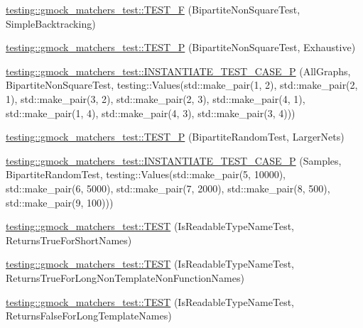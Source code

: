 \begin{DoxyCompactItemize}
\item 
\hyperlink{namespacetesting_1_1gmock__matchers__test_a7d2395b1cb6a90bdc8d46ae06f99f6c7}{testing\+::gmock\+\_\+matchers\+\_\+test\+::\+T\+E\+S\+T\+\_\+F} (Bipartite\+Non\+Square\+Test, Simple\+Backtracking)
\item 
\hyperlink{namespacetesting_1_1gmock__matchers__test_a3ac913ed55a7ac2636ae7bfce04296e9}{testing\+::gmock\+\_\+matchers\+\_\+test\+::\+T\+E\+S\+T\+\_\+P} (Bipartite\+Non\+Square\+Test, Exhaustive)
\item 
\hyperlink{namespacetesting_1_1gmock__matchers__test_a64ef722e930c3088ddea704ac20194b5}{testing\+::gmock\+\_\+matchers\+\_\+test\+::\+I\+N\+S\+T\+A\+N\+T\+I\+A\+T\+E\+\_\+\+T\+E\+S\+T\+\_\+\+C\+A\+S\+E\+\_\+P} (All\+Graphs, Bipartite\+Non\+Square\+Test, testing\+::\+Values(std\+::make\+\_\+pair(1, 2), std\+::make\+\_\+pair(2, 1), std\+::make\+\_\+pair(3, 2), std\+::make\+\_\+pair(2, 3), std\+::make\+\_\+pair(4, 1), std\+::make\+\_\+pair(1, 4), std\+::make\+\_\+pair(4, 3), std\+::make\+\_\+pair(3, 4)))
\item 
\hyperlink{namespacetesting_1_1gmock__matchers__test_ace6351a5a34b746491458140b06534ed}{testing\+::gmock\+\_\+matchers\+\_\+test\+::\+T\+E\+S\+T\+\_\+P} (Bipartite\+Random\+Test, Larger\+Nets)
\item 
\hyperlink{namespacetesting_1_1gmock__matchers__test_a857f48ffb1fc6f5ce61aec79b5c94da8}{testing\+::gmock\+\_\+matchers\+\_\+test\+::\+I\+N\+S\+T\+A\+N\+T\+I\+A\+T\+E\+\_\+\+T\+E\+S\+T\+\_\+\+C\+A\+S\+E\+\_\+P} (Samples, Bipartite\+Random\+Test, testing\+::\+Values(std\+::make\+\_\+pair(5, 10000), std\+::make\+\_\+pair(6, 5000), std\+::make\+\_\+pair(7, 2000), std\+::make\+\_\+pair(8, 500), std\+::make\+\_\+pair(9, 100)))
\item 
\hyperlink{namespacetesting_1_1gmock__matchers__test_aef0bf5f855b1e75c63ec45408b5a23ba}{testing\+::gmock\+\_\+matchers\+\_\+test\+::\+T\+E\+ST} (Is\+Readable\+Type\+Name\+Test, Returns\+True\+For\+Short\+Names)
\item 
\hyperlink{namespacetesting_1_1gmock__matchers__test_a839515535e3e75d4f80ba6ae8f7347ec}{testing\+::gmock\+\_\+matchers\+\_\+test\+::\+T\+E\+ST} (Is\+Readable\+Type\+Name\+Test, Returns\+True\+For\+Long\+Non\+Template\+Non\+Function\+Names)
\item 
\hyperlink{namespacetesting_1_1gmock__matchers__test_ad1630d47de9f4fcdc00ab4962eaeea05}{testing\+::gmock\+\_\+matchers\+\_\+test\+::\+T\+E\+ST} (Is\+Readable\+Type\+Name\+Test, Returns\+False\+For\+Long\+Template\+Names)
\item 

\end{DoxyCompactItemize}

